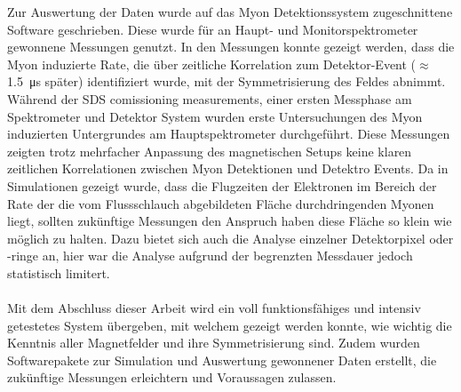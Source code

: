Zur Auswertung der Daten wurde auf das Myon Detektionssystem zugeschnittene Software geschrieben. Diese wurde f\"ur an Haupt- und Monitorspektrometer gewonnene Messungen genutzt.
In den Messungen konnte gezeigt werden, dass die Myon induzierte Rate, die \"uber zeitliche Korrelation zum Detektor-Event ($\approx$ \SI{1,5}{\micro\second} sp\"ater) identifiziert wurde, mit der Symmetrisierung des Feldes abnimmt. W\"ahrend der \glqq SDS comissioning measurements\grqq, einer ersten Messphase am Spektrometer und Detektor System wurden erste Untersuchungen des Myon induzierten Untergrundes am Hauptspektrometer durchgef\"uhrt. Diese Messungen zeigten trotz mehrfacher Anpassung des magnetischen Setups keine klaren zeitlichen Korrelationen zwischen Myon Detektionen und Detektro Events. Da in Simulationen gezeigt wurde, dass die Flugzeiten der Elektronen im Bereich der Rate der die vom Flussschlauch abgebildeten Fl\"ache durchdringenden Myonen liegt, sollten zuk\"unftige Messungen den Anspruch haben diese Fl\"ache so klein wie m\"oglich zu halten. Dazu bietet sich auch die Analyse einzelner Detektorpixel oder -ringe an, hier war die Analyse aufgrund der begrenzten Messdauer jedoch statistisch limitert.\\\\
Mit dem Abschluss dieser Arbeit wird ein voll funktionsf\"ahiges und intensiv getestetes System \"ubergeben, mit welchem gezeigt werden konnte, wie wichtig die Kenntnis aller Magnetfelder und ihre Symmetrisierung sind. Zudem wurden Softwarepakete zur Simulation und Auswertung gewonnener Daten erstellt, die zuk\"unftige Messungen erleichtern und Voraussagen zulassen.




